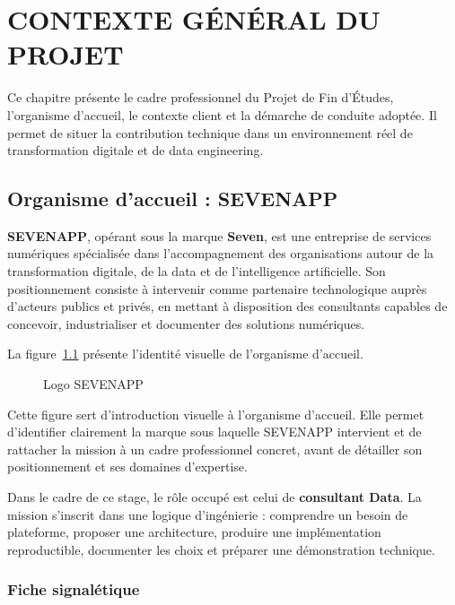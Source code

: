 \chapter{CONTEXTE GÉNÉRAL DU PROJET}
\label{ch:contexte}

Ce chapitre présente le cadre professionnel du Projet de Fin d'Études, l'organisme d'accueil, le contexte client et la démarche de conduite adoptée. Il permet de situer la contribution technique dans un environnement réel de transformation digitale et de data engineering.

\section{Organisme d'accueil : SEVENAPP}

\textbf{SEVENAPP}, opérant sous la marque \textbf{Seven}, est une entreprise de services numériques spécialisée dans l'accompagnement des organisations autour de la transformation digitale, de la data et de l'intelligence artificielle. Son positionnement consiste à intervenir comme partenaire technologique auprès d'acteurs publics et privés, en mettant à disposition des consultants capables de concevoir, industrialiser et documenter des solutions numériques.

La figure~\ref{fig:seven-logo} présente l'identité visuelle de l'organisme d'accueil.

\begin{figure}[H]
\centering
{}
\caption{Logo SEVENAPP}
\label{fig:seven-logo}
\end{figure}

Cette figure sert d'introduction visuelle à l'organisme d'accueil. Elle permet d'identifier clairement la marque sous laquelle SEVENAPP intervient et de rattacher la mission à un cadre professionnel concret, avant de détailler son positionnement et ses domaines d'expertise.

Dans le cadre de ce stage, le rôle occupé est celui de \textbf{consultant Data}. La mission s'inscrit dans une logique d'ingénierie : comprendre un besoin de plateforme, proposer une architecture, produire une implémentation reproductible, documenter les choix et préparer une démonstration technique.

\subsection{Fiche signalétique}


